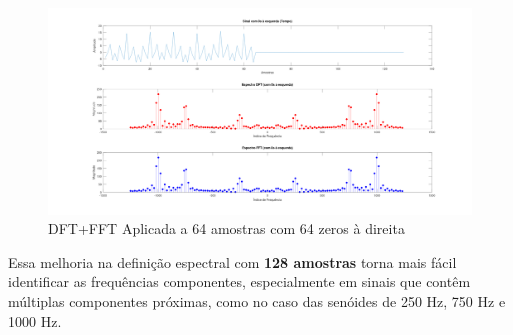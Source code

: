 \begin{figure}[H]
    \centering
    \includegraphics[width=1\linewidth]{03_experimental_analysis//assets/plot_results/64_samples_dft_fft_padded.png}
    \caption{DFT+FFT Aplicada a 64 amostras com 64 zeros à direita}
    \label{fig:signal_64samples_fft-dft_padded}
\end{figure}

Essa melhoria na definição espectral com \textbf{128 amostras} torna mais fácil identificar as frequências componentes, especialmente em sinais que contêm múltiplas componentes próximas, como no caso das senóides de 250 Hz, 750 Hz e 1000 Hz.




